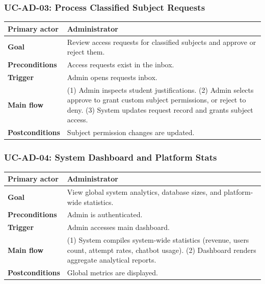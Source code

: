 \subsubsection{UC-AD-03: Process Classified Subject Requests}
\begin{longtable}{L{0.28\textwidth}L{0.62\textwidth}}
\textbf{Primary actor} & Administrator \\ \hline
\textbf{Goal} & Review access requests for classified subjects and approve or reject them. \\ \hline
\textbf{Preconditions} & Access requests exist in the inbox. \\ \hline
\textbf{Trigger} & Admin opens requests inbox. \\ \hline
\textbf{Main flow} & (1) Admin inspects student justifications. (2) Admin selects approve to grant custom subject permissions, or reject to deny. (3) System updates request record and grants subject access. \\ \hline
\textbf{Postconditions} & Subject permission changes are updated. \\
\end{longtable}

\subsubsection{UC-AD-04: System Dashboard and Platform Stats}
\begin{longtable}{L{0.28\textwidth}L{0.62\textwidth}}
\textbf{Primary actor} & Administrator \\ \hline
\textbf{Goal} & View global system analytics, database sizes, and platform-wide statistics. \\ \hline
\textbf{Preconditions} & Admin is authenticated. \\ \hline
\textbf{Trigger} & Admin accesses main dashboard. \\ \hline
\textbf{Main flow} & (1) System compiles system-wide statistics (revenue, users count, attempt rates, chatbot usage). (2) Dashboard renders aggregate analytical reports. \\ \hline
\textbf{Postconditions} & Global metrics are displayed. \\
\end{longtable}

